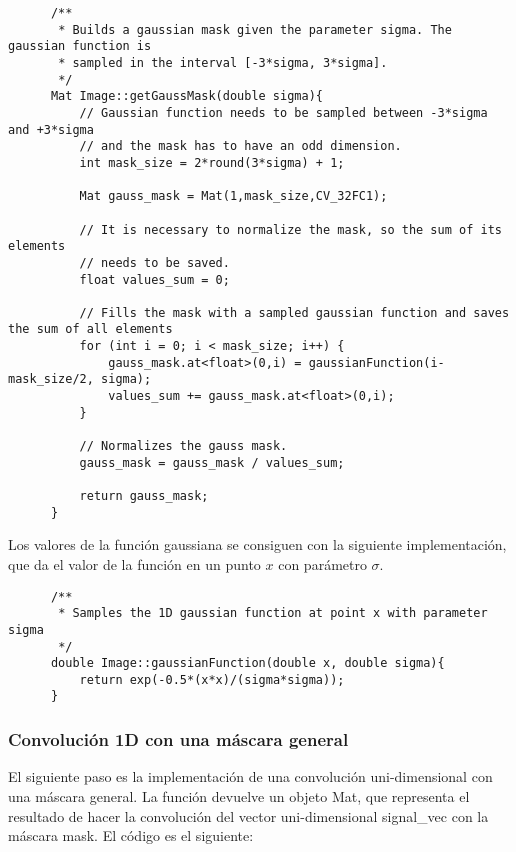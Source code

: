 \documentclass[a4paper, 11pt]{article}
\theoremstyle{definition}
\theoremstyle{theorem}
\begin{document}
  \begin{lstlisting}
      /**
       * Builds a gaussian mask given the parameter sigma. The gaussian function is
       * sampled in the interval [-3*sigma, 3*sigma].
       */
      Mat Image::getGaussMask(double sigma){
          // Gaussian function needs to be sampled between -3*sigma and +3*sigma
          // and the mask has to have an odd dimension.
          int mask_size = 2*round(3*sigma) + 1;

          Mat gauss_mask = Mat(1,mask_size,CV_32FC1);

          // It is necessary to normalize the mask, so the sum of its elements
          // needs to be saved.
          float values_sum = 0;

          // Fills the mask with a sampled gaussian function and saves the sum of all elements
          for (int i = 0; i < mask_size; i++) {
              gauss_mask.at<float>(0,i) = gaussianFunction(i-mask_size/2, sigma);
              values_sum += gauss_mask.at<float>(0,i);
          }

          // Normalizes the gauss mask.
          gauss_mask = gauss_mask / values_sum;

          return gauss_mask;
      }
  \end{lstlisting}

  Los valores de la función gaussiana se consiguen con la siguiente implementación, que da el valor de la función en un punto $x$ con parámetro $\sigma$.
  \begin{lstlisting}
      /**
       * Samples the 1D gaussian function at point x with parameter sigma
       */
      double Image::gaussianFunction(double x, double sigma){
          return exp(-0.5*(x*x)/(sigma*sigma));
      }
  \end{lstlisting}

  \subsubsection*{Convolución 1D con una máscara general}

  El siguiente paso es la implementación de una convolución uni-dimensional con una máscara general. La función devuelve un objeto Mat, que representa el resultado de hacer la convolución del vector uni-dimensional signal\_vec con la máscara mask. El código es el siguiente:
\end{document}
